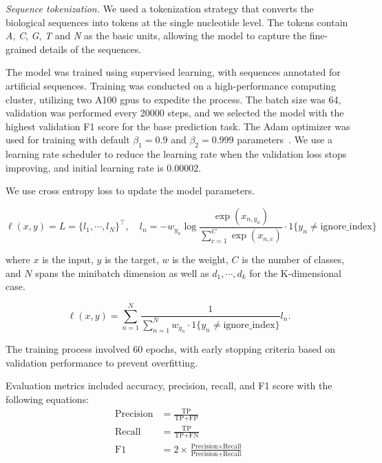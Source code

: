 \documentclass[pdflatex, sn-mathphys-num, lineno]{sn-jnl}%
\theoremstyle{thmstyleone}%
\theoremstyle{thmstyletwo}%
\theoremstyle{thmstylethree}%
\begin{document}
\textit{Sequence tokenization.} We used a tokenization strategy that converts the biological sequences into tokens at the single nucleotide level.
The tokens contain \emph{A}, \emph{C}, \emph{G}, \emph{T} and \emph{N} as the basic units, allowing the model to capture the fine-grained details of the sequences.

The model was trained using supervised learning, with sequences annotated for artificial sequences.
Training was conducted on a high-performance computing cluster, utilizing two A100 \glspl{gpu} to expedite the process.
The batch size was \num{64}, validation was performed every \num{20000} steps, and we selected the model with the highest validation F1 score for the base prediction task.
The Adam optimizer was used for training with default \( \beta_{1} = 0.9 \) and \( \beta_{2} = 0.999 \) parameters~\cite{kingma2014adam}.
We use a learning rate scheduler to reduce the learning rate when the validation loss stops improving, and initial learning rate is \num{0.00002}.

We use cross entropy loss to update the model parameters.

\[
	\ell(x, y) = L = \{l_1,\cdots,l_N\}^\top, \quad
	l_n = - w_{y_n} \log \frac{\exp(x_{n,y_n})}{\sum_{c=1}^C \exp(x_{n,c})}
	\cdot \textrm{1}\{y_n \not= \textrm{ignore\_index}\}
\]

where \( x \) is the input, \( y \) is the target, \( w \) is the weight,
\( C \) is the number of classes, and \( N \) spans the minibatch dimension as well as
\( d_1, \cdots, d_k \) for the K-dimensional case.

\[
	\ell(x, y) =   \sum_{n=1}^N \frac{1}{\sum_{n=1}^N w_{y_n} \cdot \textrm{1}\{y_n \not= \textrm{ignore\_index}\}} l_n
	.\]

The training process involved \num{60} epochs, with early stopping criteria based on validation performance to prevent overfitting.

Evaluation metrics included accuracy, precision, recall, and F1 score with the following equations:
\begin{align*}
	\textrm{Precision} & = \frac{\textrm{TP}}{\textrm{TP}+\textrm{FP}}                                                     \\
	\textrm{Recall}    & = \frac{\textrm{TP}}{\textrm{TP}+\textrm{FN}}                                                     \\
	\textrm{F1}        & = 2 \times \frac{\textrm{Precision} \times \textrm{Recall}}{\textrm{Precision} + \textrm{Recall}}
\end{align*}
\end{document}
